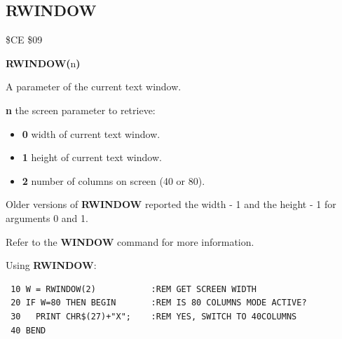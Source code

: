 
\newpage
\subsection{RWINDOW}
\begin{description}[leftmargin=2cm,style=nextline]
\item [Token:] \$CE \$09
\item [Format:] {\bf RWINDOW(}n{\bf)}
\item [Returns:]  A parameter of the current text window.

                {\bf n} the screen parameter to retrieve:

                \begin{itemize}
                    \item {\bf 0} width of current text window.
                    \item {\bf 1} height of current text window.
                    \item {\bf 2} number of columns on screen (40 or 80).
                \end{itemize}

\item [Remarks:] Older versions of {\bf RWINDOW} reported
                 the width - 1 and the height - 1 for arguments 0 and 1.

                 Refer to the {\bf WINDOW} command for more information.

\item [Example:] Using {\bf RWINDOW}:
\begin{tcolorbox}[colback=black,coltext=white]
\verbatimfont{\codefont}
\begin{verbatim}
 10 W = RWINDOW(2)           :REM GET SCREEN WIDTH
 20 IF W=80 THEN BEGIN       :REM IS 80 COLUMNS MODE ACTIVE?
 30   PRINT CHR$(27)+"X";    :REM YES, SWITCH TO 40COLUMNS
 40 BEND
\end{verbatim}
\end{tcolorbox}
\end{description}


\newpage
